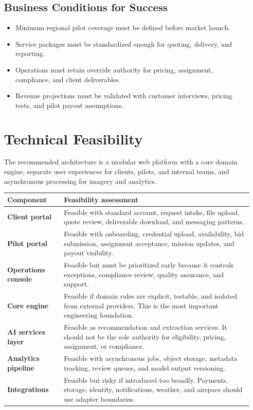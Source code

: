 \documentclass[11pt,a4paper]{article}
\begin{document}
\subsection*{Business Conditions for Success}

\begin{itemize}[leftmargin=*]
    \item Minimum regional pilot coverage must be defined before market launch.
    \item Service packages must be standardized enough for quoting, delivery, and reporting.
    \item Operations must retain override authority for pricing, assignment, compliance, and client deliverables.
    \item Revenue projections must be validated with customer interviews, pricing tests, and pilot payout assumptions.
\end{itemize}

\section{Technical Feasibility}

The recommended architecture is a modular web platform with a core domain engine, separate user experiences for clients, pilots, and internal teams, and asynchronous processing for imagery and analytics.

\begin{longtable}{>{\bfseries}p{}p{}}
\toprule
Component & Feasibility assessment \\
\midrule
Client portal & Feasible with standard account, request intake, file upload, quote review, deliverable download, and messaging patterns. \\
Pilot portal & Feasible with onboarding, credential upload, availability, bid submission, assignment acceptance, mission updates, and payout visibility. \\
Operations console & Feasible but must be prioritized early because it controls exceptions, compliance review, quality assurance, and support. \\
Core engine & Feasible if domain rules are explicit, testable, and isolated from external providers. This is the most important engineering foundation. \\
AI services layer & Feasible as recommendation and extraction services. It should not be the sole authority for eligibility, pricing, assignment, or compliance. \\
Analytics pipeline & Feasible with asynchronous jobs, object storage, metadata tracking, review queues, and model output versioning. \\
Integrations & Feasible but risky if introduced too broadly. Payments, storage, identity, notifications, weather, and airspace should use adapter boundaries. \\
\bottomrule
\end{longtable}
\end{document}
